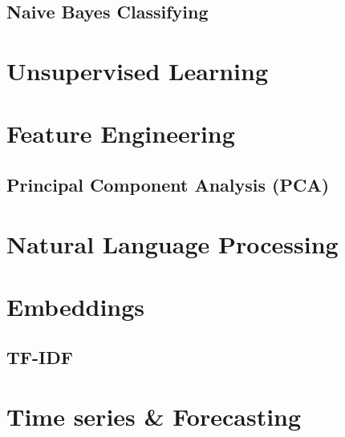 \documentclass[12pt]{article}
\begin{document}
\subsection{Naive Bayes Classifying }


\printbibliography[heading=subbibnumbered]

\pagebreak

\section{Unsupervised Learning}
\newrefsection

\pagebreak

\section{Feature Engineering}
\newrefsection

\subsection{Principal Component Analysis (PCA)}



\pagebreak



\section{Natural Language Processing}
\newrefsection

\section{Embeddings}

\subsection{TF-IDF}


\pagebreak


\section{Time series \& Forecasting}
\newrefsection
\end{document}
